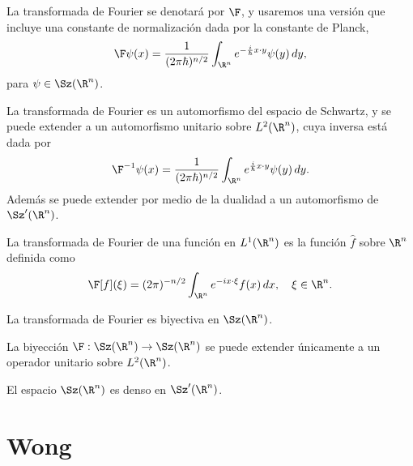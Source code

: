   \begin{definition}
    La transformada de Fourier se denotará por $\F$,
    y usaremos una versión que incluye una constante de
    normalización dada por la constante de Planck,
    \[
      \F\psi(x)
      = \frac{1}{(2\pi\hbar)^{n / 2}} \int_{\R^{n}}
      e^{-\frac{i}{\hbar} x \cdot y} \psi(y) \, dy,
    \] 
    para $\psi \in \Sz(\R^{n})$.
  \end{definition}
  La transformada de Fourier es un automorfismo del espacio
  de Schwartz, y se puede extender a un automorfismo
  unitario sobre $L^2(\R^{n})$, cuya inversa está dada por
  \[
    \F^{-1}\psi(x)
    = \frac{1}{(2\pi\hbar)^{n / 2}} \int_{\R^{n}}
    e^{\frac{i}{\hbar} x \cdot y} \psi(y) \, dy.
  \] 
  Además se puede extender por medio de la dualidad a un
  automorfismo de $\Sz'(\R^{n})$.

  \begin{definition}
    La transformada de Fourier de una función en
    $L^{1}(\R^{n})$ es la función $\hat{f}$ sobre $\R^{n}$ 
    definida como
    \[
      \F[f](\xi) = (2\pi)^{-n / 2} \int_{\R^{n}} e^{-i x
      \cdot \xi} f(x) \, dx, 
      \quad \xi \in \R^{n}.
    \] 
  \end{definition}

  \begin{theorem}
    La transformada de Fourier es biyectiva en
    $\Sz(\R^{n})$.
  \end{theorem}

  \begin{theorem}[Plancherel]
    La biyección $\F : \Sz(\R^{n}) \to \Sz(\R^{n})$ 
    se puede extender únicamente a un operador unitario
    sobre $L^2(\R^{n})$.
  \end{theorem}

  \begin{proposition}
    El espacio $\Sz(\R^{n})$ es denso en $\Sz'(\R^{n})$.
  \end{proposition}

  \section{Wong}

